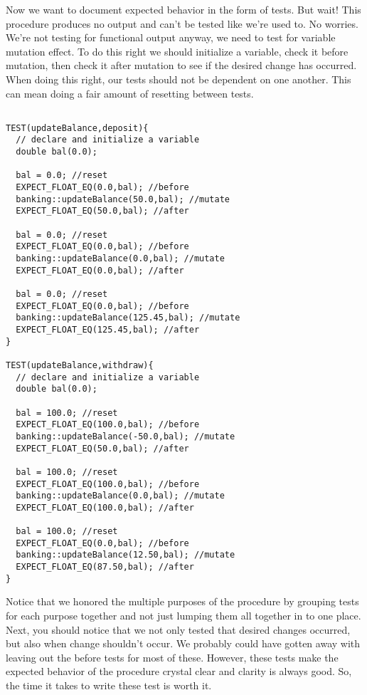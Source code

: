 Now we want to document expected behavior in the form of tests.  But wait! This procedure produces no output and can't be tested like we're used to.  No worries. We're not testing for functional output anyway, we need to test for variable mutation effect. To do this right we should initialize a variable, check it before mutation, then check it after mutation to see if the desired change has occurred. When doing this right, our tests should not be dependent on one another. This can mean doing a fair amount of resetting between tests. 
\begin{verbatim}

TEST(updateBalance,deposit){
  // declare and initialize a variable
  double bal(0.0);

  bal = 0.0; //reset
  EXPECT_FLOAT_EQ(0.0,bal); //before
  banking::updateBalance(50.0,bal); //mutate
  EXPECT_FLOAT_EQ(50.0,bal); //after

  bal = 0.0; //reset
  EXPECT_FLOAT_EQ(0.0,bal); //before
  banking::updateBalance(0.0,bal); //mutate
  EXPECT_FLOAT_EQ(0.0,bal); //after

  bal = 0.0; //reset
  EXPECT_FLOAT_EQ(0.0,bal); //before
  banking::updateBalance(125.45,bal); //mutate
  EXPECT_FLOAT_EQ(125.45,bal); //after
}

TEST(updateBalance,withdraw){
  // declare and initialize a variable
  double bal(0.0);

  bal = 100.0; //reset
  EXPECT_FLOAT_EQ(100.0,bal); //before
  banking::updateBalance(-50.0,bal); //mutate
  EXPECT_FLOAT_EQ(50.0,bal); //after

  bal = 100.0; //reset
  EXPECT_FLOAT_EQ(100.0,bal); //before
  banking::updateBalance(0.0,bal); //mutate
  EXPECT_FLOAT_EQ(100.0,bal); //after

  bal = 100.0; //reset
  EXPECT_FLOAT_EQ(0.0,bal); //before
  banking::updateBalance(12.50,bal); //mutate
  EXPECT_FLOAT_EQ(87.50,bal); //after
}
\end{verbatim}
Notice that we honored the multiple purposes of the procedure by grouping tests for each purpose together and not just lumping them all together in to one place. Next, you should notice that we not only tested that desired changes occurred, but also when change shouldn't occur. We probably could have gotten away with leaving out the before tests for most of these. However, these tests make the expected behavior of the procedure crystal clear and clarity is always good. So, the time it takes to write these test is worth it.  

